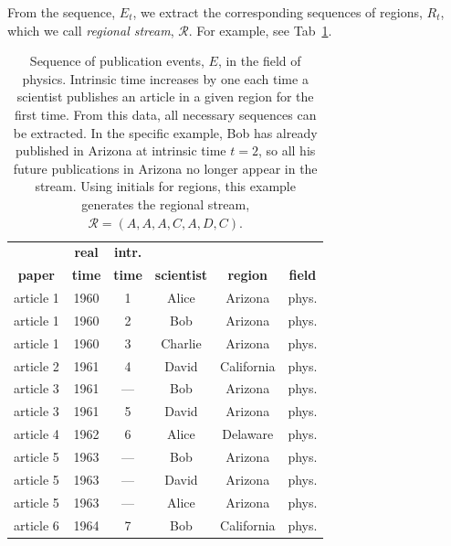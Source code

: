 \documentclass[draft,final]{vutinfth} %
\begin{document}
%
From the sequence, $E_t$, we extract the corresponding sequences of regions, $R_t$,  which we call \emph{regional stream}, $\mathcal{R}$. For example, 
see Tab~\ref{tbl:stream}.

\begin{table}[t]
    \centering
    \caption{Sequence of publication events, $E$,  in the field of physics. Intrinsic time increases by one each time a scientist publishes an article in a given region for the first time. From this data, all necessary sequences can be extracted. In the specific example, Bob has already published in Arizona at intrinsic time $t=2$, so all his future publications in Arizona no longer appear in the stream. Using initials for regions, this example generates  the regional stream, $ \mathcal{R} = (A,A,A,C,A,D,C)$.
}
    \begin{tabular}{ c c c c c c }
\textbf{} & \textbf{real} & \textbf{intr.} & \textbf{} & \textbf{} & \textbf{} \\
\textbf{paper} & \textbf{time} & \textbf{time} & \textbf{scientist} & \textbf{region} & \textbf{field} \\
    \hline
article 1 & 1960 & 1    &   Alice   & Arizona   & phys.    \\
article 1 & 1960 & 2    &   Bob     & Arizona   & phys.    \\
article 1 & 1960 & 3    &   Charlie & Arizona   & phys.    \\
\hline
article 2 & 1961 & 4    &   David   & California    & phys.\\
\hline
article 3 & 1961 & ---  &   Bob     & Arizona    & phys.   \\
article 3 & 1961 & 5    &   David   & Arizona    & phys.   \\
\hline
article 4 & 1962 & 6    &   Alice   & Delaware  & phys.    \\
\hline
article 5 & 1963 & ---  &   Bob       & Arizona   & phys.    \\
article 5 & 1963 & ---  &   David     & Arizona   & phys.    \\
article 5 & 1963 & ---  &   Alice     & Arizona   & phys.    \\
\hline
article 6 & 1964 & 7    &   Bob       & California & phys.   \\
    \hline
\end{tabular}
    \label{tbl:stream}
\end{table}
\end{document}
